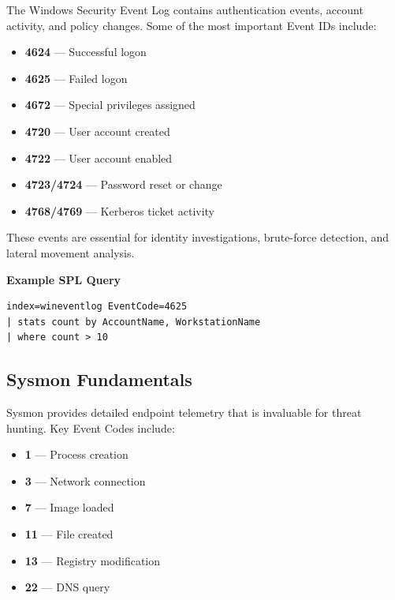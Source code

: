 The Windows Security Event Log contains authentication events, account activity, and policy changes. 
Some of the most important Event IDs include:

\begin{itemize}
    \item \textbf{4624} — Successful logon
    \item \textbf{4625} — Failed logon
    \item \textbf{4672} — Special privileges assigned
    \item \textbf{4720} — User account created
    \item \textbf{4722} — User account enabled
    \item \textbf{4723/4724} — Password reset or change
    \item \textbf{4768/4769} — Kerberos ticket activity
\end{itemize}

These events are essential for identity investigations, brute-force detection, and lateral movement analysis.

\textbf{Example SPL Query}

\begin{lstlisting}
index=wineventlog EventCode=4625
| stats count by AccountName, WorkstationName
| where count > 10
\end{lstlisting}


\subsection*{Sysmon Fundamentals}

Sysmon provides detailed endpoint telemetry that is invaluable for threat hunting. 
Key Event Codes include:

\begin{itemize}
    \item \textbf{1} — Process creation
    \item \textbf{3} — Network connection
    \item \textbf{7} — Image loaded
    \item \textbf{11} — File created
    \item \textbf{13} — Registry modification
    \item \textbf{22} — DNS query
\end{itemize}

